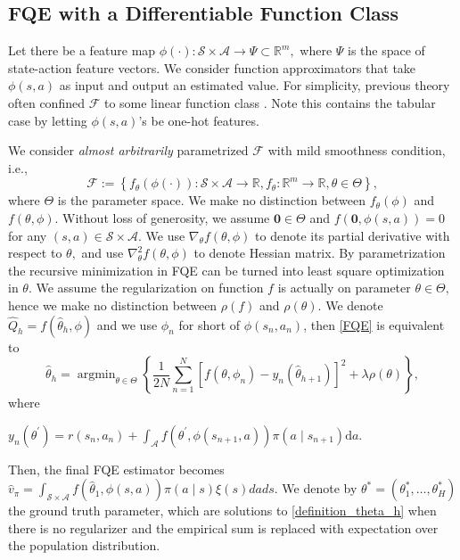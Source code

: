 \documentclass{article}
\numberwithin{equation}{section}
\theoremstyle{plain}
\theoremstyle{definition}
\theoremstyle{remark}
\begin{document}
\subsection{FQE with a Differentiable Function Class}
Let there be a feature map $\phi(\cdot): \mathcal{S} \times \mathcal{A} \to \Psi \subset \mathbb{R}^m,$ where $\Psi$ is the space of state-action feature vectors. We consider function approximators that take $\phi(s,a)$ as input and output an estimated value. For simplicity, previous theory often confined $\mathcal{F}$ to some linear function class \citep{bootstrap, duan2020minimax}. Note this contains the tabular case by letting $\phi(s,a)$'s be one-hot features.

We consider {\it almost arbitrarily} parametrized $\mathcal{F}$ with mild smoothness condition, i.e., 
$$
\mathcal{F}:=\left\{f_{\theta}(\phi(\cdot)): \mathcal{S} \times \mathcal{A} \rightarrow \mathbb{R}, f_{\theta}: \mathbb{R}^{m} \rightarrow \mathbb{R}, \theta\in\Theta \right\},
$$
where $\Theta$ is the parameter space.
We make no distinction between $f_{\theta}(\phi)$ and $f(\theta,\phi).$ Without loss of generosity, we assume $\boldsymbol{0} \in \Theta$ and $f(\boldsymbol{0},\phi(s,a)) = 0 $ for any $(s,a) \in \mathcal{S} \times \mathcal{A}.$ We use $\nabla_{\theta} f(\theta,\phi)$ to denote its partial derivative with respect to $\theta,$ and use $\nabla_{\theta }^2 f(\theta,\phi)$ to denote Hessian matrix. By parametrization the recursive minimization in FQE can be turned into least square optimization in $\theta$. We assume the regularization on function $f$ is actually on parameter $\theta \in \Theta,$ hence we make no distinction between $\rho(f)$ and $\rho(\theta).$ We denote $\widehat{Q}_h = f(\widehat{\theta}_h,\phi)$ and we use $\phi_n$ for short of $\phi(s_n,a_n)$, then \eqref{FQE} is equivalent to
\begin{equation}\label{definition_theta_h}
    \widehat{\theta}_h = \mathop{\arg \min}_{\theta \in \Theta} \left\{\frac{1}{2N} \sum_{n=1}^N \left[f(\theta,\phi_n) - y_n(\widehat{\theta}_{h+1})\right]^2 + \lambda \rho(\theta)\right\},
\end{equation}
where \begin{footnotesize} $y_n(\theta^\prime) = r(s_n,a_n) +  \int_{\mathcal{A}} f(\theta^\prime, \phi(s_{n+1},a)) \pi(a \mid s_{n+1}) \mathrm{d} a.$ \end{footnotesize} Then, the final FQE estimator becomes 
$
    \widehat{v}_{\pi} = \int_{\mathcal{S} \times \mathcal{A}} f(\widehat{\theta}_1,\phi(s,a)) \pi(a \mid s) \xi(s) d a d s.
$
We denote by $\theta^*=(\theta^*_1,\ldots,\theta^*_H)$ the ground truth parameter, which are solutions to \eqref{definition_theta_h} when there is no regularizer and the empirical sum is replaced with expectation over the population distribution. 
\end{document}
